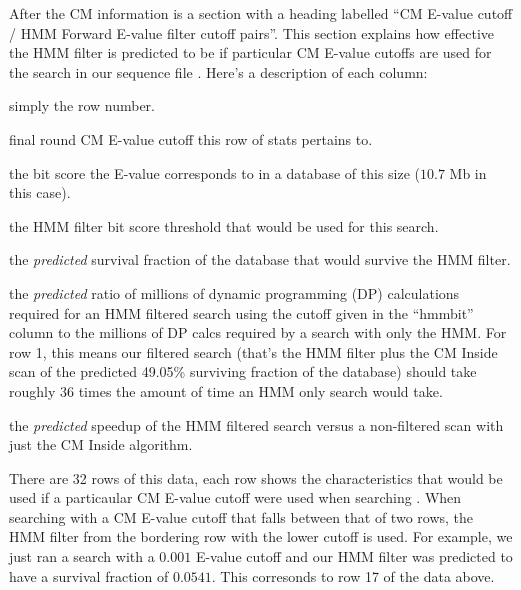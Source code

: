 After the CM information is a section with a heading labelled ``CM 
E-value cutoff / HMM Forward E-value filter cutoff pairs''. This
section explains how effective the HMM filter is predicted to be if
particular CM E-value cutoffs are used for the search in our sequence file
. Here's a description of each column:
\begin{wideitem}

\item[\emprog{idx}] simply the row number.

\item[\emprog{cm E}] final round CM E-value cutoff this row of stats pertains
  to.

\item[\emprog{cm bit}] the bit score the E-value corresponds to in a
  database of this size ($10.7$ Mb in this case).

\item[\emprog{hmm bit}] the HMM filter bit score threshold that would
  be used for this search.

\item[\emprog{surv}] the \textit{predicted} survival fraction of the database
  that would survive the HMM filter.

\item[\emprog{xhmm}] the \emph{predicted} ratio of millions of dynamic programming (DP)
  calculations required for an HMM filtered search using the cutoff
  given in the ``hmmbit'' column to the millions of DP calcs required
  by a search with only the HMM. For row 1, this means our filtered search
  (that's the HMM filter plus the CM Inside scan of the predicted
  49.05\% surviving fraction of the database) should take
  roughly 36 times the amount of time an HMM only search would take.
  
\item[\emprog{speedup}] the \textit{predicted} speedup of the HMM filtered
  search versus a non-filtered scan with just the CM Inside algorithm.

\end{wideitem}

There are 32 rows of this data, each row shows the characteristics
that would be used if a particaular CM E-value cutoff were used when
searching . When searching with a
CM E-value cutoff that falls between that of two rows, the HMM filter
from the bordering row with the lower cutoff is used. For example, we
just ran a search with a $0.001$ E-value cutoff and our HMM filter was
predicted to have a survival fraction of $0.0541$. This corresonds to
row 17 of the data above. 

